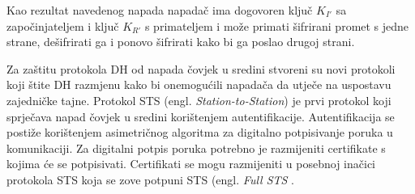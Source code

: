 Kao rezultat navedenog napada napadač ima dogovoren ključ $K_{I'}$ sa
započinjateljem i ključ $K_{R'}$ s primateljem i može primati šifrirani promet s
jedne strane, dešifrirati ga i ponovo šifrirati kako bi ga poslao drugoj strani.

Za zaštitu protokola DH od napada čovjek u sredini stvoreni su
novi protokoli koji štite DH razmjenu kako bi onemogućili napadača
da utječe na uspostavu zajedničke tajne. Protokol STS (engl.
\emph{Station-to-Station}) je prvi protokol koji sprječava napad
čovjek u sredini korištenjem autentifikacije. Autentifikacija se postiže
korištenjem asimetričnog algoritma za digitalno potpisivanje poruka u
komunikaciji. Za digitalni potpis poruka potrebno je razmijeniti certifikate s
kojima će se potpisivati. Certifikati se mogu razmijeniti u posebnoj inačici
protokola STS koja se zove potpuni STS (engl. \emph{Full STS}  \cite[str.
1256]{van2011encyclopedia}.


